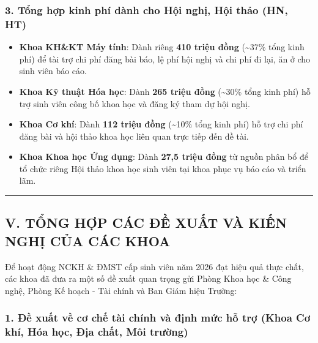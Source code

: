 \documentclass[11pt,a4paper]{article}
\providecommand{\tightlist}{%
  \setlength{\itemsep}{0pt}\setlength{\parskip}{0pt}}
\begin{document}
\subsubsection{3. Tổng hợp kinh phí dành cho Hội nghị, Hội thảo (HN,
HT)}\label{tux1ed5ng-hux1ee3p-kinh-phuxed-duxe0nh-cho-hux1ed9i-nghux1ecb-hux1ed9i-thux1ea3o-hn-ht}

\begin{itemize}
\tightlist
\item
  \textbf{Khoa KH\&KT Máy tính}: Dành riêng \textbf{410 triệu đồng}
  (\textasciitilde37\% tổng kinh phí) để tài trợ chi phí đăng bài báo,
  lệ phí hội nghị và chi phí đi lại, ăn ở cho sinh viên báo cáo.
\item
  \textbf{Khoa Kỹ thuật Hóa học}: Dành \textbf{265 triệu đồng}
  (\textasciitilde30\% tổng kinh phí) hỗ trợ sinh viên công bố khoa học
  và đăng ký tham dự hội nghị.
\item
  \textbf{Khoa Cơ khí}: Dành \textbf{112 triệu đồng}
  (\textasciitilde10\% tổng kinh phí) hỗ trợ chi phí đăng bài và hội
  thảo khoa học liên quan trực tiếp đến đề tài.
\item
  \textbf{Khoa Khoa học Ứng dụng}: Dành \textbf{27,5 triệu đồng} từ
  nguồn phân bổ để tổ chức riêng Hội thảo khoa học sinh viên tại khoa
  phục vụ báo cáo và triển lãm.
\end{itemize}

\begin{center}\rule{0.5\linewidth}{0.5pt}\end{center}

\subsection{V. TỔNG HỢP CÁC ĐỀ XUẤT VÀ KIẾN NGHỊ CỦA CÁC
KHOA}\label{v.-tux1ed5ng-hux1ee3p-cuxe1c-ux111ux1ec1-xuux1ea5t-vuxe0-kiux1ebfn-nghux1ecb-cux1ee7a-cuxe1c-khoa}

Để hoạt động NCKH \& ĐMST cấp sinh viên năm 2026 đạt hiệu quả thực chất,
các khoa đã đưa ra một số đề xuất quan trọng gửi Phòng Khoa học \& Công
nghệ, Phòng Kế hoạch - Tài chính và Ban Giám hiệu Trường:

\subsubsection{1. Đề xuất về cơ chế tài chính và định mức hỗ trợ (Khoa
Cơ khí, Hóa học, Địa chất, Môi
trường)}\label{ux111ux1ec1-xuux1ea5t-vux1ec1-cux1a1-chux1ebf-tuxe0i-chuxednh-vuxe0-ux111ux1ecbnh-mux1ee9c-hux1ed7-trux1ee3-khoa-cux1a1-khuxed-huxf3a-hux1ecdc-ux111ux1ecba-chux1ea5t-muxf4i-trux1b0ux1eddng}
\end{document}
